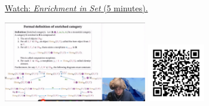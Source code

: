 
\begin{minipage}{10cm}
    \href{https://act4e-spring21.netlify.app/videos/spring2021-enrichment:set-enriched.html}{Watch: \emph{Enrichment in Set} (5 minutes).}
        
    \href{https://act4e-spring21.netlify.app/videos/spring2021-enrichment:set-enriched.html}{\includegraphics[height=3.5cm]{spring2021-enrichment:set-enriched/thumbnails.jpg}}
    \href{https://act4e-spring21.netlify.app/videos/spring2021-enrichment:set-enriched.html}{\includegraphics[height=2.5cm]{spring2021-enrichment:set-enriched/qrcode.png}}
\end{minipage}
